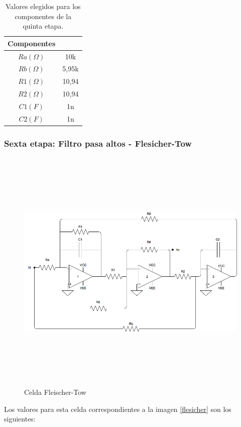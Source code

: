 \begin{table}[H] 
	\centering
	\begin{tabular}{c c}
		Componentes \\
		\hline
		$Ra (\Omega)$ &  10k \\
		$Rb (\Omega)$ & 5,95k  \\
		$R1 (\Omega)$ &  10,94 \\
		$R2 (\Omega)$ &  10,94 \\
		$C1 (F)$ & 1n \\
		$C2 (F)$ & 1n \\
		\hline
	\end{tabular}
	\caption{Valores elegidos para los componentes de la quinta etapa.}
	\label{componentes5}
\end{table}

\subsubsection{Sexta etapa: Filtro pasa altos - Flesicher-Tow}


 \begin{figure}[H] %
	\centering
	\includegraphics[width=12cm,height=12cm,keepaspectratio]{../Imagenes/FLEISCHER.png}
	\caption{Celda Fleischer-Tow}
	\label{fleischer}
\end{figure}

Los valores para esta celda correspondientes a la imagen \ref{flesicher} son los siguientes:

